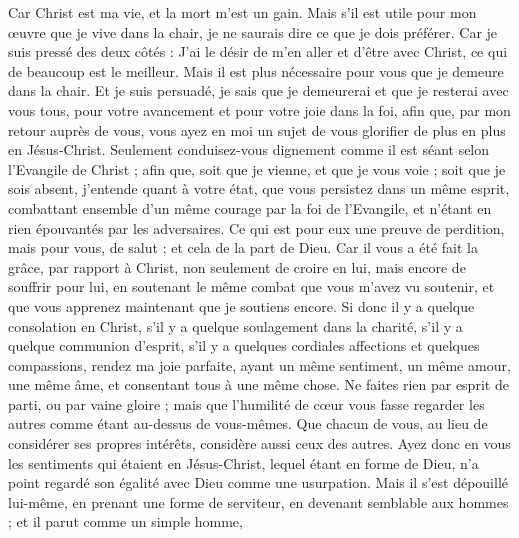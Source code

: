 \begin{multicols}{2}
Car Christ est ma vie, et la mort m’est un gain.
Mais s'il est utile pour mon œuvre que je vive dans la chair, je ne saurais dire ce que je dois préférer.
Car je suis pressé des deux côtés : J’ai le désir de m’en aller et d’être avec Christ, ce qui de beaucoup est le meilleur.
Mais il est plus nécessaire pour vous que je demeure dans la chair.
Et je suis persuadé, je sais que je demeurerai et que je resterai avec vous tous, pour votre avancement et pour votre joie dans la foi,
afin que, par mon retour auprès de vous, vous ayez en moi un sujet de vous glorifier de plus en plus en Jésus-Christ.
Seulement conduisez-vous dignement comme il est séant selon l'Evangile de Christ ; afin que, soit que je vienne, et que je vous voie ; soit que je sois absent, j'entende quant à votre état, que vous persistez dans un même esprit, combattant ensemble d'un même courage par la foi de l’Evangile, et n'étant en rien épouvantés par les adversaires.
Ce qui est pour eux une preuve de perdition, mais pour vous, de salut ; et cela de la part de Dieu.
Car il vous a été fait la grâce, par rapport à Christ, non seulement de croire en lui, mais encore de souffrir pour lui,
en soutenant le même combat que vous m’avez vu soutenir, et que vous apprenez maintenant que je soutiens encore.
\VerseOne{}Si donc il y a quelque consolation en Christ, s’il y a quelque soulagement dans la charité, s'il y a quelque communion d'esprit, s'il y a quelques cordiales affections et quelques compassions,
rendez ma joie parfaite, ayant un même sentiment, un même amour, une même âme, et consentant tous à une même chose.
Ne faites rien par esprit de parti, ou par vaine gloire ; mais que l’humilité de cœur vous fasse regarder les autres comme étant au-dessus de vous-mêmes.
Que chacun de vous, au lieu de considérer ses propres intérêts, considère aussi ceux des autres.
Ayez donc en vous les sentiments qui étaient en Jésus-Christ,
lequel étant en forme de Dieu, n'a point regardé son égalité avec Dieu comme une usurpation.
Mais il s’est dépouillé lui-même, en prenant une forme de serviteur, en devenant semblable aux hommes ; et il parut comme un simple homme,

\end{multicols}
